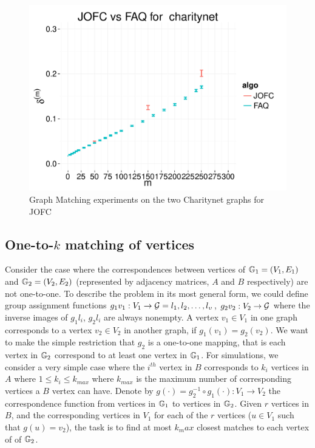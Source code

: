 \documentclass[12pt,oneside,final]{thesis}\usepackage[]{graphicx}\usepackage[]{color}
\begin{document}
\begin{figure}
\includegraphics[scale=0.4]{charitynet_SGM_JOFCvsFAQ}
\caption{Graph Matching experiments on the two Charitynet graphs for JOFC \label{charitynet_graphmatch}}
\end{figure}

\subsection{One-to-$k$ matching of vertices} 

Consider the case where the correspondences between vertices of $\mathbb{G}_1=(V_1,E_1)$ and $\mathbb{G}_2= (V_2,E_2)$ (represented by adjacency matrices, $A$ and $B$ respectively) are not one-to-one. To describe the problem in its most general form, we could define group assignment functions $g_1{v_1}: V_1 \rightarrow \mathcal{G}={l_1,l_2,\ldots,l_{\upsilon}}$, $g_2{v_2}:V_2 \rightarrow \mathcal{G}$ where the inverse images of $g_1{l_i}$, $g_2{l_i}$ are always nonempty. A vertex $v_1 \in  V_1$ in one graph corresponds to a vertex $v_2 \in  V_2$  in another graph, if $g_1(v_1)=g_2(v_2)$. We want to make the simple restriction that $g_2$ is a one-to-one mapping, that is each vertex in $\mathbb{G}_2$ correspond to at least one vertex in  $\mathbb{G}_1$.
For simulations, we consider a very simple case where the $i^{th}$ vertex in $B$ corresponds to $k_i$ vertices in $A$ where $1\leq k_i \leq k_{max}$ where $k_{max}$ is the maximum number of corresponding vertices a $B$ vertex can have.  Denote by $g(\cdot)=g_2^{-1}\circ g_1(\cdot) : V_1 \rightarrow V_2$ the correspondence function from vertices in $\mathbb{G}_1$ to vertices in $\mathbb{G}_2$. Given $r$ vertices in $B$, and the corresponding vertices in $V_1$ for each of the $r$ vertices ($u \in V_1$ such that $g(u)=v_2$), the task is  to find at most $k_max$ closest matches to each vertex of of $\mathbb{G}_2$. 
\end{document}
